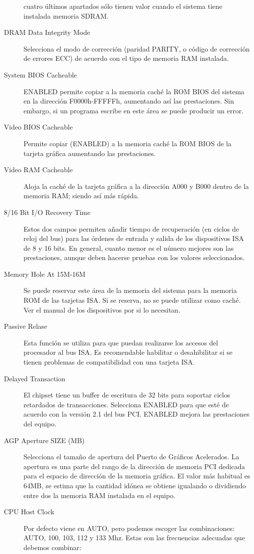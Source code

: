 \begin{description}
					cuatro últimos apartados sólo tienen valor cuando el
					sistema tiene instalada memoria SDRAM.
				\item[DRAM Data Integrity Mode] Selecciona el modo de
					corrección (paridad PARITY, o código de corrección de
					errores ECC) de acuerdo con el tipo de memoria RAM
					instalada.
				\item[System BIOS Cacheable] ENABLED permite copiar a la
					memoria caché la ROM BIOS del sistema en la dirección
					F0000h-FFFFFh, aumentando así las prestaciones. Sin
					embargo, si un programa escribe en este área se puede
					producir un error.
				\item[Video BIOS Cacheable] Permite copiar (ENABLED) a la
					memoria caché la ROM BIOS de la tarjeta gráfica aumentando
					las prestaciones.
				\item[Video RAM Cacheable] Aloja la caché de la tarjeta gráfica
					a la dirección A000 y B000 dentro de la memoria RAM; siendo
					así más rápida.
				\item[8/16 Bit I/O Recovery Time] Estos dos campos permiten
					añadir tiempo de recuperación (en ciclos de reloj del bus)
					para las órdenes de entrada y salida de los dispositivos
					ISA de 8 y 16 bits. En general, cuanto menor es el número
					mejores son las prestaciones, aunque deben hacerse pruebas
					con los valores seleccionados.
				\item[Memory Hole At 15M-16M] Se puede reservar este área de la
					memoria del sistema para la memoria ROM de las tarjetas
					ISA. Si se reserva, no se puede utilizar como caché. Ver el
					manual de los dispositivos por si lo necesitan.
				\item[Passive Relase] Esta función se utiliza para que puedan
					realizarse los accesos del procesador al bus ISA. Es
					recomendable habilitar o desahibilitar si se tienen
					problemas de compatibilidad con una tarjeta ISA.
				\item[Delayed Transaction] El chipset tiene un buffer de
					escritura de 32 bits para soportar ciclos retardados de
					transacciones. Selecciona ENABLED para que esté de acuerdo
					con la versión 2.1 del bus PCI. ENABLED mejora las
					prestaciones del equipo.
				\item[AGP Aperture SIZE (MB)] Selecciona el tamaño de apertura
					del Puerto de Gráficos Acelerados.  La apertura es una
					parte del rango de la dirección de memoria PCI dedicada
					para el espacio de dirección de la memoria gráfica.  El
					valor más habitual es 64MB, se estima que la cantidad
					idónea se obtiene igualando o dividiendo entre dos la
					memoria RAM instalada en el equipo.
				\item[CPU Host Clock] Por defecto viene en AUTO, pero podemos
					escoger las combinaciones: AUTO, 100, 103, 112 y 133 Mhz.
				    Estas son las frecuencias adecuadas que debemos combinar: \\ 


\end{description}
